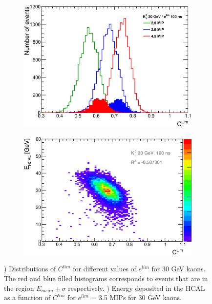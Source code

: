\begin{figure}[htbp!]
  \centering
  \begin{subfigure}[t]{0.49\textwidth}
    \centering
    \includegraphics[width=1\linewidth]{../Thesis_Plots/ILD/AdditionalPlots/Plots/CLim_100ns_30GeV.eps}
    \caption{} \label{fig:CLim30_100ns}
  \end{subfigure}
  \hfill
  \begin{subfigure}[t]{0.49\textwidth}
    \centering
    \includegraphics[width=1\linewidth]{../Thesis_Plots/ILD/AdditionalPlots/Plots/EhcalCLim_100ns_30GeV.eps}
    \caption{} \label{fig:EhcalCLim30_100ns}
  \end{subfigure}
  \caption{) Distributions of $C^{lim}$ for different values of $e^{lim}$ for 30 GeV kaons. The red and blue filled histograms corresponds to events that are in the region $E_{mean} \pm \sigma$ respectively. ) Energy deposited in the HCAL as a function of $C^{lim}$ for $e^{lim}$ = 3.5 MIPs for 30 GeV kaons.}
\end{figure}

